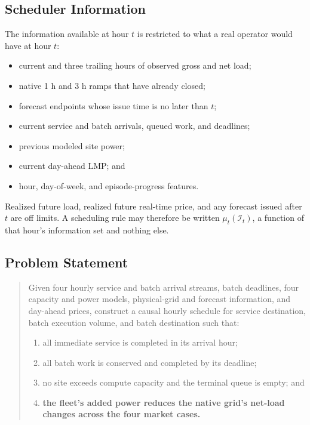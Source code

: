 \documentclass[conference]{IEEEtran}
\begin{document}
\subsection{Scheduler Information}
\label{subsec:problem-causality}

The information available at hour \(t\) is restricted to what a real operator would have at hour \(t\):
\begin{itemize}
  \item current and three trailing hours of observed gross and net load;
  \item native 1 h and 3 h ramps that have already closed;
  \item forecast endpoints whose issue time is no later than \(t\);
  \item current service and batch arrivals, queued work, and deadlines;
  \item previous modeled site power;
  \item current day-ahead LMP; and
  \item hour, day-of-week, and episode-progress features.
\end{itemize}

Realized future load, realized future real-time price, and any forecast issued after \(t\) are off limits. A scheduling rule may therefore be written \(\mu_t(\mathcal{I}_t)\), a function of that hour's information set and nothing else.

\subsection{Problem Statement}
\label{subsec:problem-formal-statement}

\begin{quote}
Given four hourly service and batch arrival streams, batch
deadlines, four capacity and power models, physical-grid and forecast
information, and day-ahead prices, construct a causal hourly schedule for
service destination, batch execution volume, and batch destination such that:
\begin{enumerate}
  \item all immediate service is completed in its arrival hour;
  \item all batch work is conserved and completed by its deadline;
  \item no site exceeds compute capacity and the terminal queue is empty; and
  \item \textbf{the fleet's added power reduces the native grid's net-load changes across the four market cases.}
\end{enumerate}
\end{quote}
\end{document}
